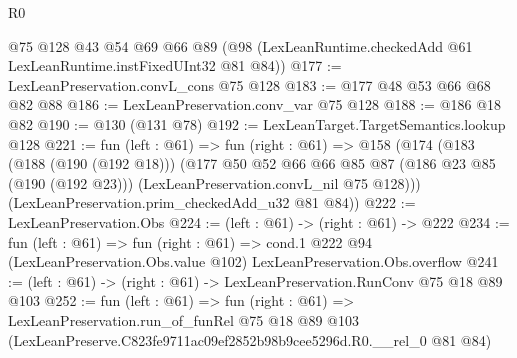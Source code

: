 \begin{lexlean}{R0}
\begin{coremodule}
    @75
    @128
    @43
    @54
    @69
    @66
    @89
    (@98 (LexLeanRuntime.checkedAdd @61 LexLeanRuntime.instFixedUInt32 @81 @84))
@177 := LexLeanPreservation.convL_cons @75 @128
@183 := @177 @48 @53 @66 @68 @82 @88
@186 := LexLeanPreservation.conv_var @75 @128
@188 := @186 @18 @82
@190 := @130 (@131 @78)
@192 := LexLeanTarget.TargetSemantics.lookup @128
@221 := fun (left : @61) =>
  fun (right : @61) =>
  @158
    (@174
      (@183
        (@188 (@190 (@192 @18)))
        (@177
          @50
          @52
          @66
          @66
          @85
          @87
          (@186 @23 @85 (@190 (@192 @23)))
          (LexLeanPreservation.convL_nil @75 @128)))
      (LexLeanPreservation.prim_checkedAdd_u32 @81 @84))
@222 := LexLeanPreservation.Obs
@224 := (left : @61) -> (right : @61) -> @222
@234 := fun (left : @61) =>
  fun (right : @61) =>
  cond.{1} @222 @94 (LexLeanPreservation.Obs.value @102) LexLeanPreservation.Obs.overflow
@241 := (left : @61) -> (right : @61) -> LexLeanPreservation.RunConv @75 @18 @89 @103
@252 := fun (left : @61) =>
  fun (right : @61) =>
  LexLeanPreservation.run_of_funRel
    @75
    @18
    @89
    @103
    (LexLeanPreserve.C823fe9711ac09ef2852b98b9cee5296d.R0.__rel_0 @81 @84)
\end{coremodule}
\end{lexlean}
